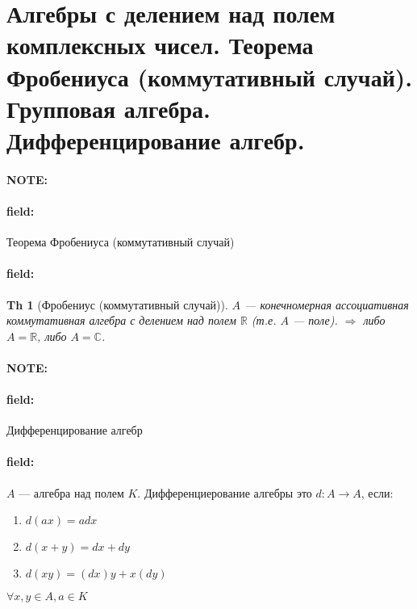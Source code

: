 \documentclass[12pt]{article}
\newenvironment{note}{\paragraph{NOTE:}}{}
\newenvironment{field}{\paragraph{field:}}{}
\newtheorem{theorem}{Th}
\begin{document}
\section{Алгебры с делением над полем комплексных чисел. Теорема Фробениуса
(коммутативный случай). Групповая алгебра. Дифференцирование алгебр.}


\begin{note}
  \begin{field}
    Теорема Фробениуса (коммутативный случай)
  \end{field}
  \begin{field}
    \begin{theorem}[Фробениус (коммутативный случай)]
      $A$ --- конечномерная ассоциативная коммутативная алгебра с делением над полем $\mathbb{R}$ (т.е. $A$ --- поле).
      $\Rightarrow$
      либо $A = \mathbb{R}$,
      либо $A = \mathbb{C}$.
    \end{theorem}
  \end{field}
\end{note}


\begin{note}
  \begin{field}
    Дифференцирование алгебр
  \end{field}
  \begin{field}
    $A$ --- алгебра над полем $K$.
    Дифференциерование алгебры это $d : A \rightarrow A$, если:
    \begin{enumerate}
      \item
      $d (ax) = adx$
      \item
      $d (x + y) = dx + dy$
      \item
      $d (xy) = (dx) y + x (dy)$
    \end{enumerate}

    $\forall x, y \in A, a \in K$
  \end{field}
\end{note}

\end{document}
